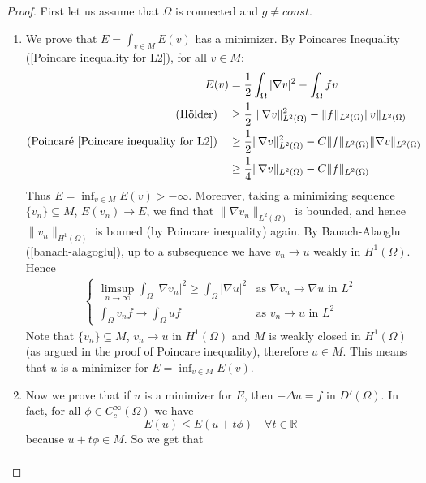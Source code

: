 \documentclass{report}
\theoremstyle{tommy}
\begin{document}
  \begin{proof}
    First let us assume that \(\Omega\) is connected and \(g \ne const\).
    \begin{enumerate}[label=Step \arabic*:]
      \item We prove that \(E = \int_{v \in M} E(v)\) has a minimizer. By Poincares Inequality (\ref{Poincare inequality for L2}), for all \(v \in M\):
      \begin{align*}
        E(v) 
        &= \frac{1}{2} \int_\Omega|\nabla v|^2 - \int_\Omega fv \\
        \text{(Hölder)}\quad&\ge \frac{1}{2} \|\nabla v\|_{L^2(\Omega)}^2 - \|f\|_{L^2(\Omega)} \|v\|_{L^2(\Omega)} \\
        \text{(Poincaré \ref{Poincare inequality for L2})}\quad&\ge \frac{1}{2} \|\nabla v\|_{L^2(\Omega)}^2 - C \|f\|_{L^2(\Omega)} \|\nabla v\|_{L^2(\Omega)} \\
        &\ge \frac{1}{4} \| \nabla v\|_{L^2(\Omega)} - C\|f\|_{L^2(\Omega)}
      \end{align*}
      Thus \(E = \inf_{v \in M} E(v) > - \infty\). Moreover, taking a minimizing sequence \(\{v_n\} \subseteq M\), \(E(v_n) \to E\), we find that \(\|\nabla v_n\|_{L^2(\Omega)}\) is bounded, and hence \(\|v_n\|_{H^1(\Omega)}\) is bouned (by Poincare inequality) again. By Banach-Alaoglu (\ref{banach-alagoglu}), up to a subsequence we have \(v_n \to u\) weakly in \(H^1(\Omega)\). Hence \begin{align*}
        \begin{cases}
          \limsup_{n \to \infty} \int_\Omega |\nabla v_n|^2 \ge \int_\Omega |\nabla u|^2 & \text{as } \nabla v_n \to \nabla u \text{ in } L^2 \\
          \int_\Omega v_n f \to \int_\Omega u f &\text{as } v_n \to u \text{ in } L^2
        \end{cases}
      \end{align*}
      Note that \(\{v_n\} \subseteq M\), \(v_n \to u\) in \(H^1(\Omega)\) and \(M\) is weakly closed in \(H^1(\Omega)\) (as argued in the proof of Poincare inequality), therefore \(u \in M\). This means that \(u\) is a minimizer for \(E = \inf_{v \in M} E(v)\).
      \item Now we prove that if \(u\) is a minimizer for \(E\), then \(- \Delta u = f\) in \(D'(\Omega)\). In fact, for all \(\phi \in C_c^\infty(\Omega)\) we have 
      \[E(u) \le E(u + t \phi) \quad \forall t \in \mathbb{R}\]
      because \(u + t \phi \in M\). So we get that 
      \begin{align*}

\end{align*}
\end{enumerate}
\end{proof}
\end{document}
